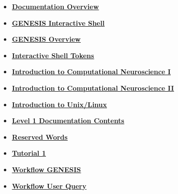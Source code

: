 \documentclass[12pt]{article}
\begin{document}
\begin{itemize}
\item \href{../documentation-overview/documentation-overview.pdf}{\bf \underline{Documentation Overview}}

\item \href{../gshell/gshell.pdf}{\bf \underline{GENESIS Interactive Shell}}

\item \href{../genesis-overview/genesis-overview.pdf}{\bf \underline{GENESIS Overview}}

\item \href{../shell-tokens/shell-tokens.pdf}{\bf \underline{Interactive Shell Tokens}}

\item \href{../compneurosci-1/compneurosci-1.pdf}{\bf \underline{Introduction to Computational Neuroscience I}}

\item \href{../compneurosci-2/compneurosci-2.pdf}{\bf \underline{Introduction to Computational Neuroscience II}}

\item \href{../unix-linux/unix-linux.pdf}{\bf \underline{Introduction to Unix/Linux}}

\item \href{../contents-level1/contents-level1.pdf}{\bf \underline{Level 1 Documentation Contents}}

\item \href{../reserved-words/reserved-words.pdf}{\bf \underline{Reserved Words}}

\item \href{../tutorial1/tutorial1.pdf}{\bf \underline{Tutorial 1}}

\item \href{../workflow-genesis/workflow-genesis.pdf}{\bf \underline{Workflow GENESIS}}

\item \href{../workflow-user-query/workflow-user-query.pdf}{\bf \underline{Workflow User Query}}


\end{itemize}

\end{document}
